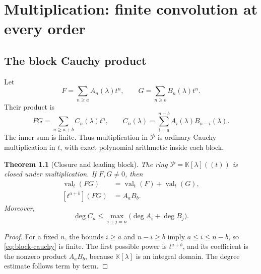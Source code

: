 \documentclass[11pt,openany]{book}
\theoremstyle{definition}
\theoremstyle{plain}
\newtheorem{theorem}{Theorem}[chapter]
\theoremstyle{remark}
\newcommand{\K}{\mathbb{K}}
\newcommand{\Plog}{\mathscr{P}}
\DeclareMathOperator{\val}{val}
\DeclareMathOperator{\polydeg}{deg}
\begin{document}
\chapter{Multiplication: finite convolution at every order}\label{ch:multiplication}

\section{The block Cauchy product}
Let
\begin{equation}\label{eq:FG-blocks}
 F=\sum_{n\ge a}A_n(\lambda)t^n,
 \qquad
 G=\sum_{n\ge b}B_n(\lambda)t^n.
\end{equation}
Their product is
\begin{equation}\label{eq:block-cauchy}
 FG=\sum_{n\ge a+b}C_n(\lambda)t^n,
 \qquad
 C_n(\lambda)=\sum_{i=a}^{n-b}A_i(\lambda)B_{n-i}(\lambda).
\end{equation}
The inner sum is finite. Thus multiplication in \(\Plog\) is ordinary Cauchy multiplication in \(t\), with exact polynomial arithmetic inside each block.

\begin{theorem}[Closure and leading block]\label{thm:multiplication}
The ring \(\Plog=\K[\lambda]((t))\) is closed under multiplication. If \(F,G\ne0\), then
\begin{align}
 \val_t(FG)&=\val_t(F)+\val_t(G),\label{eq:val-product}\\
 [t^{a+b}](FG)&=A_aB_b.\label{eq:lead-product}
\end{align}
Moreover,
\begin{equation}\label{eq:degree-bound-product}
 \polydeg C_n\le
 \max_{i+j=n}\bigl(\polydeg A_i+\polydeg B_j\bigr).
\end{equation}
\end{theorem}

\begin{proof}
For a fixed \(n\), the bounds \(i\ge a\) and \(n-i\ge b\) imply \(a\le i\le n-b\), so \cref{eq:block-cauchy} is finite. The first possible power is \(t^{a+b}\), and its coefficient is the nonzero product \(A_aB_b\), because \(\K[\lambda]\) is an integral domain. The degree estimate follows term by term.
\end{proof}
\end{document}
